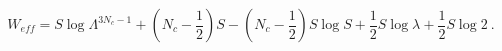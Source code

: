 \begin{equation}
\label{Massl1}
W_{eff}=S \log{\Lambda^{3N_c-1}} +\left(N_c-\frac{1}{2} \right)S 
-\left(N_c-\frac{1}{2} \right)S \log{S} + \frac{1}{2}S
\log{\lambda}+\frac{1}{2}S \log{2} ~.
\end{equation}

